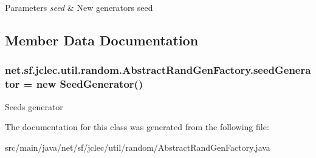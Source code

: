 \begin{DoxyParams}{Parameters}
{\em seed} & New generators seed \\
\hline
\end{DoxyParams}


\subsection{Member Data Documentation}
\hypertarget{classnet_1_1sf_1_1jclec_1_1util_1_1random_1_1_abstract_rand_gen_factory_ae3ca4d4c2dd0f8b276b2ef5d9725dae8}{
\subsubsection[{seed\-Generator}]{ net.\-sf.\-jclec.\-util.\-random.\-Abstract\-Rand\-Gen\-Factory.\-seed\-Generator = new {\bf Seed\-Generator}()\hspace{0.3cm}{\ttfamily [protected]}}}\label{classnet_1_1sf_1_1jclec_1_1util_1_1random_1_1_abstract_rand_gen_factory_ae3ca4d4c2dd0f8b276b2ef5d9725dae8}
Seeds generator 

The documentation for this class was generated from the following file\-:\begin{DoxyCompactItemize}
\item 
src/main/java/net/sf/jclec/util/random/Abstract\-Rand\-Gen\-Factory.\-java\end{DoxyCompactItemize}
